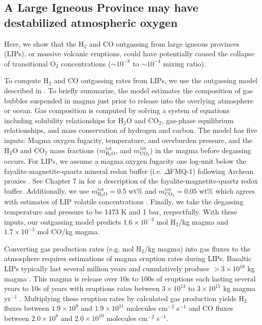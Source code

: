 \subsection{A Large Igneous Province may have destabilized atmospheric oxygen}

Here, we show that the H$_2$ and CO outgassing from large igneous provinces (LIPs), or massive volcanic eruptions, could have potentially caused the collapse of transitional O$_2$ concentrations ($\sim 10^{-8}$ to $\sim 10^{-4}$ mixing ratio). 

To compute H$_2$ and CO outgassing rates from LIPs, we use the outgassing model described in \citet{Wogan_2020_methane}. To briefly summarize, the model estimates the composition of gas bubbles suspended in magma just prior to release into the overlying atmosphere or ocean. Gas composition is computed by solving a system of equations including solubility relationships for H$_2$O and CO$_2$, gas-phase equilibrium relationships, and mass conservation of hydrogen and carbon. The model has five inputs: Magma oxygen fugacity, temperature, and overburden pressure, and the H$_2$O and CO$_2$ mass fractions ($m_\mathrm{H_2O}^\mathrm{tot}$, and $m_\mathrm{CO_2}^\mathrm{tot}$) in the magma before degassing occurs. For LIPs, we assume a magma oxygen fugacity one log-unit below the fayalite-magnetite-quartz mineral redox buffer (i.e. $\Delta$FMQ-1) following Archean proxies \citep{Aulbach_2016}. See Chapter 7 in \citet{Catling_2017} for a description of the fayalite-magnetite-quartz redox buffer. Additionally, we use $m_\mathrm{H_2O}^\mathrm{tot} = 0.5$ wt\% and $m_\mathrm{CO_2}^\mathrm{tot} = 0.05$ wt\% which agrees with estimates of LIP volatile concentrations \citep{Wallace_2015}. Finally, we take the degassing temperature and pressure to be 1473 K and 1 bar, respectfully. With these inputs, our outgassing model predicts $1.6 \times 10^{-2}$ mol H$_2$/kg magma and $1.7 \times 10^{-3}$ mol CO/kg magma. 

Converting gas production rates (e.g. mol H$_2$/kg magma) into gas fluxes to the atmosphere requires estimations of magma eruption rates during LIPs. Basaltic LIPs typically last several million years and cumulatively produce $>3 \times 10^{18}$ kg magma \citep{Self_2015}. This magma is release over 10s to 100s of eruptions each lasting several years to 10s of years with eruptions rates between $3 \times 10^{13}$ to $3 \times 10^{15}$ kg magma yr$^{-1}$ \citep{Bryan_2010}. Multiplying these eruption rates by calculated gas production yields H$_2$ fluxes between $1.9 \times 10^9$ and $1.9 \times 10^{11}$ molecules cm$^{-2}$ s$^{-1}$ and CO fluxes between $2.0 \times 10^8$ and $2.0 \times 10^{10}$ molecules cm$^{-2}$ s$^{-1}$. 

